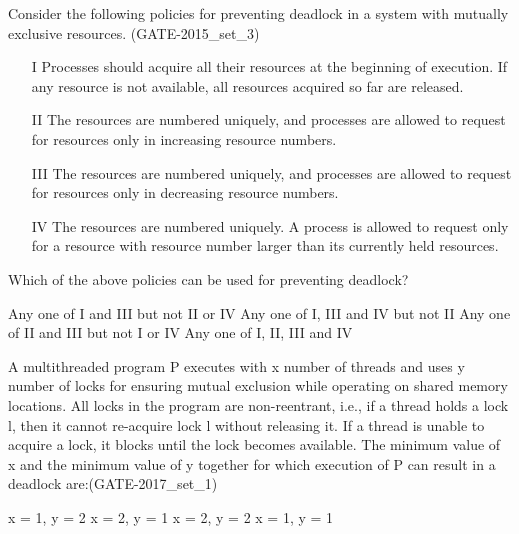 \begin{minipage}{\linewidth}

  \question  Consider the following policies for preventing deadlock in a system with mutually exclusive resources. (GATE-2015\_set\_3)

  \begin{enumerate}
      \item[I]  Processes should acquire all their resources at the beginning of execution.
                If any resource is not available, all resources acquired so far are released.
      \item[II] The resources are numbered uniquely, and processes are allowed to request
                for resources only in increasing resource numbers.
      \item[III] The resources are numbered uniquely, and processes are allowed to request
                  for resources only in decreasing resource numbers.
      \item[IV]  The resources are numbered uniquely. A process is allowed to request only for a
                  resource with resource number larger than its currently held resources.
  \end{enumerate}
  Which of the above policies can be used for preventing deadlock?

  \begin{choices}
    \choice Any one of I and III but not II or IV
    \choice Any one of I, III and IV but not II
    \choice Any one of II and III but not I or IV
    \choice Any one of I, II, III and IV
  \end{choices}

  \end{minipage}

\vspace{0.08in}


\begin{minipage}{\linewidth}

  \question  A multithreaded program P executes with x number of threads and uses y number of locks for ensuring
            mutual exclusion while operating on shared memory locations. All locks in the program are
            non-reentrant, i.e., if a thread holds a lock l, then it cannot re-acquire lock l without
            releasing it. If a thread is unable to acquire a lock, it blocks until the lock becomes available.
            The minimum value of x and the minimum value of y together for which execution of P can result
            in a deadlock are:(GATE-2017\_set\_1)

  \begin{choices}
    \choice x = 1, y = 2
    \choice x = 2, y = 1
    \choice x = 2, y = 2
    \choice x = 1, y = 1
  \end{choices}

  \end{minipage}

